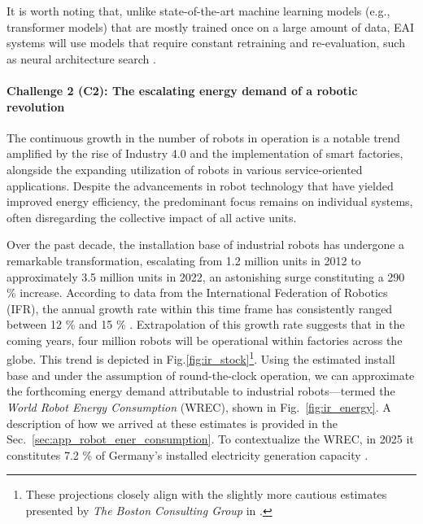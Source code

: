 \documentclass[12pt]{article}
\begin{document}
It is worth noting that, unlike state-of-the-art machine learning models (e.g., transformer models) that are mostly trained once on a large amount of data, EAI systems will use models that require constant retraining and re-evaluation, such as neural architecture search \cite{real2019regularized}. %

\paragraph*{\textbf{Challenge 2} (C2): The escalating energy demand of a robotic revolution}\label{sec:robots_challenge}
The continuous growth in the number of robots in operation is a notable trend amplified by the rise of Industry 4.0 and the implementation of smart factories, alongside the expanding utilization of robots in various service-oriented applications. Despite the advancements in robot technology that have yielded improved energy efficiency, the predominant focus remains on individual systems, often disregarding the collective impact of all active units.

Over the past decade, the installation base of industrial robots has undergone a remarkable transformation, escalating from 1.2 million units in 2012 to approximately 3.5 million units in 2022, an astonishing surge constituting a 290 \% increase. According to data from the International Federation of Robotics (IFR), the annual growth rate within this time frame has consistently ranged between 12 \% and 15 \% \cite{IFR2019}. Extrapolation of this growth rate suggests that in the coming years, four million robots will be operational within factories across the globe. This trend is depicted in Fig.\ref{fig:ir_stock}\footnote{These projections closely align with the slightly more cautious estimates presented by \textit{The Boston Consulting Group} in \cite{sirkin2015}.}. Using the estimated install base and under the assumption of round-the-clock operation, we can approximate the forthcoming energy demand attributable to industrial robots---termed the \textit{World Robot Energy Consumption} (WREC), shown in Fig.~\ref{fig:ir_energy}. A description of how we arrived at these estimates is provided in the  Sec.~\ref{sec:app_robot_ener_consumption}. To contextualize the WREC, in 2025 it constitutes 7.2 \% of Germany's installed electricity generation capacity \cite{fraunhofer2016}.
\end{document}

